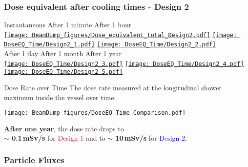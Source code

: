 \documentclass[xcolor={dvipsnames}]{beamer}
\begin{document}
\begin{frame}
  \frametitle{Dose equivalent after cooling times - \textbf{Design 2}}
  \hypertarget{coolingtimesprev_Design2}{}
  \begin{center}
    \hspace*{1cm} Instantaneous \hfill After 1 minute \hfill After 1 hour \hspace*{1.2cm} \\
  \hyperlink{Dose_equivalent_Design2}{\texttt{[image: BeamDump\_figures/Dose\_equivalent\_total\_Design2.pdf]}}
  \hyperlink{Dose_equivalent_minute_Design2}{\texttt{[image: DoseEQ\_Time/Design2\_1.pdf]}}
  \hyperlink{Dose_equivalent_hour_Design2}{\texttt{[image: DoseEQ\_Time/Design2\_2.pdf]}}\\
    \hspace*{1.2cm} After 1 day \hfill After 1 month \hfill After 1 year\hspace*{1.4cm} \\
  \hyperlink{Dose_equivalent_day_Design2}{\texttt{[image: DoseEQ\_Time/Design2\_3.pdf]}}
  \hyperlink{Dose_equivalent_month_Design2}{\texttt{[image: DoseEQ\_Time/Design2\_4.pdf]}}
  \hyperlink{Dose_equivalent_year_Design2}{\texttt{[image: DoseEQ\_Time/Design2\_5.pdf]}}
 \end{center}
\end{frame}
\begin{frame}{Dose Rate over Time}
The dose rate measured at the longitudinal shower maximum inside the vessel over time:
\begin{center}
  \texttt{[image: BeamDump\_figures/DoseEQ\_Time\_Comparison.pdf]}
\end{center}
\textbf{After one year}, the dose rate drops to \\\textbf{$\sim$ 0.1\,mSv/s} for \textcolor{Red}{Design 1} and to \textbf{$\sim$ 10\,mSv/s} for \textcolor{Blue}{Design 2}.
\end{frame}




\subsubsection{Particle Fluxes}
\end{document}
